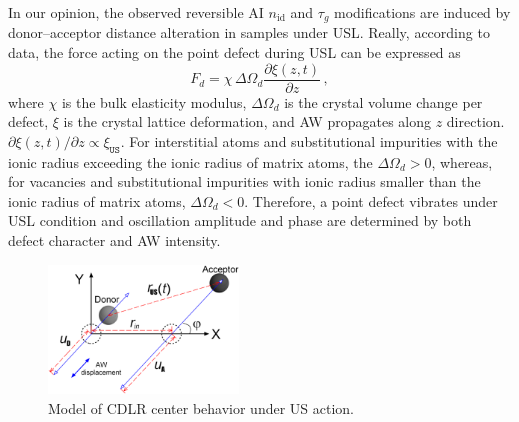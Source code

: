 \documentclass[aip,jap, amsmath,amssymb,reprint]{revtex4-1}
\begin{document}
In our opinion, the observed reversible AI $n_{\mathrm{id}}$ and $\tau_g$ modifications are induced by
donor--acceptor distance alteration in samples under USL.
Really, according to data,\cite{MirzadeJAP2011,PeleshchakUJF2016} the force acting on the point defect during USL can be expressed as
\begin{equation}
\label{eqFd}
F_d=\chi\,\Delta\Omega_d\frac{\partial \xi(z,t)}{\partial z}\,,
\end{equation}
where
$\chi$ is the bulk elasticity modulus,
$\Delta\Omega_d$ is the crystal volume change per defect,
$\xi$ is the crystal lattice deformation,
and AW propagates along $z$ direction.
$\partial \xi(z,t)/\partial z\propto \xi_{\mathtt{US}}$.
For interstitial atoms and substitutional impurities with the ionic radius exceeding the ionic radius of matrix
atoms, the $\Delta\Omega_d > 0$, whereas,
for vacancies and substitutional impurities with ionic radius smaller than the ionic radius of matrix atoms,
$\Delta\Omega_d < 0$.
Therefore, a point defect vibrates under USL condition and oscillation amplitude and phase are determined by both defect character and AW intensity.

\begin{figure}
\includegraphics[width=0.45\textwidth]{fig_5}%
\caption{\label{fig_Model}
Model of CDLR center behavior under US action.
}%
\end{figure}
\end{document}
